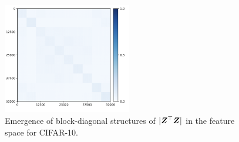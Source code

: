 \documentclass[../../book-main.tex]{subfiles}
\begin{document}
\begin{figure}[t]
     \footnotesize
     \centering
    \includegraphics[width=0.5\textwidth]{chapters/chapter5/figs/CIFAR10_cifar10_heatmap_zz.png}
    \caption{\small Emergence of block-diagonal structures of $|\bm{Z}^\top \bm{Z}|$ in the feature space for CIFAR-10.}
    \label{fig:heatmap_z}
\end{figure}
\end{document}

